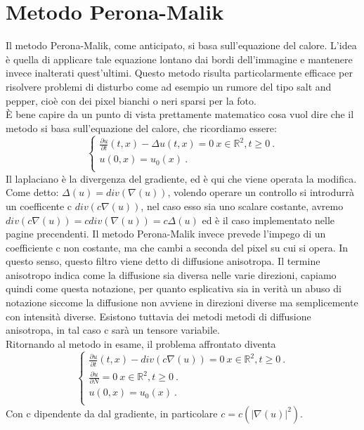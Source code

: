 \newpage
\section{Metodo Perona-Malik}

Il metodo Perona-Malik, come anticipato, si basa sull'equazione del calore. L'idea è quella di applicare tale equazione lontano dai bordi dell'immagine e mantenere invece inalterati quest'ultimi.
Questo metodo risulta particolarmente efficace per risolvere problemi di disturbo come ad esempio un rumore del tipo salt and pepper, cioè con dei pixel bianchi o neri sparsi per la foto.\\
\vspace{1em}
\`E bene capire da un punto di vista prettamente matematico cosa vuol dire che il metodo si basa sull'equazione del calore, che ricordiamo essere:\\
\begin{equation} 
\begin{cases}
\frac{\partial u}{\partial t}(t,x)-\Delta u(t,x) = 0 \ x \in \mathbb R^2, t\ge 0 \ .\\ 
u(0,x) = u_0(x)\ . \\
\end{cases}
\end{equation}
Il laplaciano è la divergenza del gradiente, ed è qui che viene operata la modifica.\\
Come detto: $\Delta(u)=div(\nabla(u))$, volendo operare un controllo si introdurrà un coefficente c $div(c\nabla(u))$, nel caso esso sia uno scalare costante, avremo $div(c\nabla(u))=cdiv(\nabla(u))=c\Delta(u)$ ed è il caso implementato nelle pagine precendenti. Il metodo Perona-Malik invece prevede l'impego di un coefficiente c non costante, ma che cambi a seconda del pixel su cui si opera. In questo senso, questo filtro viene detto di diffusione anisotropa. Il termine anisotropo indica come la diffusione sia diversa nelle varie direzioni, capiamo quindi come questa notazione, per quanto esplicativa sia in verità un abuso di notazione siccome la diffusione non avviene in direzioni diverse ma semplicemente con intensità diverse. Esistono tuttavia dei metodi metodi di diffusione anisotropa, in tal caso c sarà un tensore variabile.\\
Ritornando al metodo in esame, il problema affrontato diventa\\
\begin{equation} 
\begin{cases}
\frac{\partial u}{\partial t}(t,x)-div(c\nabla(u)) = 0 \ x \in \mathbb R^2, t\ge 0 \ .\\ 
\frac{\partial u}{\partial N}=0 \ x \in \mathbb R^2, t\ge 0 \ .\\ 
u(0,x) = u_0(x)\ . \\
\end{cases}
\end{equation}
Con c dipendente da dal gradiente, in particolare $c=c(|\nabla(u)|^2)$.

